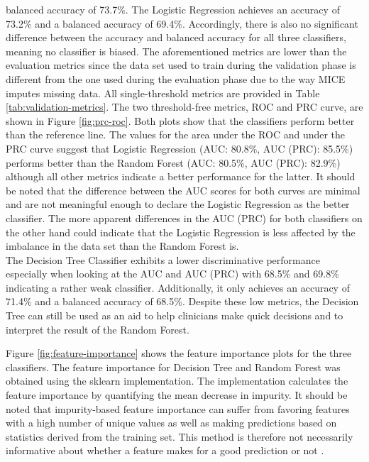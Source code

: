 balanced accuracy of 73.7\%. The Logistic Regression achieves an accuracy of 
73.2\% and a balanced accuracy of 69.4\%. Accordingly, there is 
also no significant difference between the accuracy and balanced accuracy for 
all three classifiers, meaning no classifier is biased.
The aforementioned metrics are lower than the evaluation metrics since the data 
set used to train during the validation phase is different from the one used 
during the evaluation phase due to the way MICE imputes missing data.
All single-threshold metrics are provided in Table \ref{tab:validation-metrics}.
The two threshold-free metrics, ROC and PRC curve, are shown in Figure 
\ref{fig:prc-roc}. Both plots show that the classifiers perform better than the 
reference line. The values for the area under the ROC and under the PRC curve 
suggest that Logistic Regression (AUC: 80.8\%, AUC (PRC): 85.5\%) performs 
better than the Random Forest (AUC: 80.5\%, AUC (PRC): 82.9\%) although all 
other metrics indicate a better performance for the latter. It 
should be noted that the difference between the AUC scores for both curves are 
minimal and are not meaningful enough to declare the Logistic Regression as the 
better classifier. The more apparent differences in the AUC (PRC) for both 
classifiers on the other hand could indicate that the Logistic Regression is 
less affected by the imbalance in the data set than the Random Forest is.
\\
The Decision Tree Classifier exhibits a lower discriminative performance
especially when looking at the AUC and AUC (PRC) with 68.5\% and 69.8\% 
indicating a rather weak classifier. Additionally, it only 
achieves an accuracy of 71.4\% and a balanced accuracy of 68.5\%. Despite 
these low metrics, the Decision Tree can still be used as an aid to 
help clinicians make quick decisions and to interpret the result of the Random 
Forest.
\par
Figure \ref{fig:feature-importance} shows the feature importance plots for the 
three classifiers. The feature importance for Decision Tree and Random Forest 
was obtained using the sklearn implementation. The implementation calculates 
the feature importance by quantifying the mean decrease in impurity. 
It should be noted that impurity-based feature importance can suffer 
from favoring features with a high number of unique values as well as making 
predictions based on statistics derived from the training set. This method is 
therefore not necessarily informative about whether a feature makes for a 
good prediction or not \cite{RN178}.
